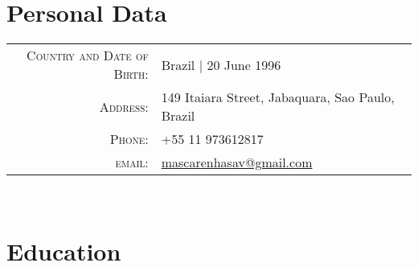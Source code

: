 \documentclass[a4paper,10pt]{article} %
\begin{document}
\pagestyle{empty} %

\newcommand{\fb}{\fontspec{Latin Modern Roman}} %

\centering{\texttt{[image: 3x4]}}
\par{\bigskip\par} %

\section{Personal Data}

\begin{tabular}{rl}
\textsc{Country and Date of Birth:} & Brazil  | 20 June 1996 \\
\textsc{Address:} & 149 Itaiara Street, Jabaquara, Sao Paulo, Brazil \\
\textsc{Phone:} & +55 11 973612817\\
\textsc{email:} & \href{mailto:mascarenhasav@gmail.com}{mascarenhasav@gmail.com}
\end{tabular}
\\

\section{Education}
\end{document}
